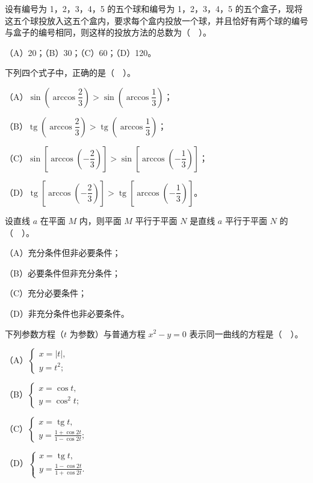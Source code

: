 \begin{question}
设有编号为 1，2，3，4，5 的五个球和编号为 1，2，3，4，5 的五个盒子，现将这五个球投放入这五个盒内，要求每个盒内投放一个球，并且恰好有两个球的编号与盒子的编号相同，则这样的投放方法的总数为（　）。

（A）20；（B）30；（C）60；（D）120。

\end{question}
\begin{question}
下列四个式子中，正确的是（　）。

（A）$\sin\left(\arccos\dfrac{2}{3}\right)>\sin\left(\arccos\dfrac{1}{3}\right)$；

（B）$\operatorname{tg}\left(\arccos\dfrac{2}{3}\right)>\operatorname{tg}\left(\arccos\dfrac{1}{3}\right)$；

（C）$\sin\left[\arccos\left(-\dfrac{2}{3}\right)\right]>\sin\left[\arccos\left(-\dfrac{1}{3}\right)\right]$；

（D）$\operatorname{tg}\left[\arccos\left(-\dfrac{2}{3}\right)\right]>\operatorname{tg}\left[\arccos\left(-\dfrac{1}{3}\right)\right]$。

\end{question}
\begin{question}
设直线 $a$ 在平面 $M$ 内，则平面 $M$ 平行于平面 $N$ 是直线 $a$ 平行于平面 $N$ 的（　）。

（A）充分条件但非必要条件；

（B）必要条件但非充分条件；

（C）充分必要条件；

（D）非充分条件也非必要条件。

\end{question}
\begin{question}
下列参数方程（$t$ 为参数）与普通方程 $x^{2}-y=0$ 表示同一曲线的方程是（　）。

（A）$\begin{cases}x=|t|,\\ y=t^{2};\end{cases}$

（B）$\begin{cases}x=\cos t,\\ y=\cos^{2}t;\end{cases}$

（C）$\begin{cases}x=\operatorname{tg}t,\\ y=\frac{1+\cos 2t}{1-\cos 2t};\end{cases}$

（D）$\begin{cases}x=\operatorname{tg}t,\\ y=\frac{1-\cos 2t}{1+\cos 2t}.\end{cases}$

\end{question}

